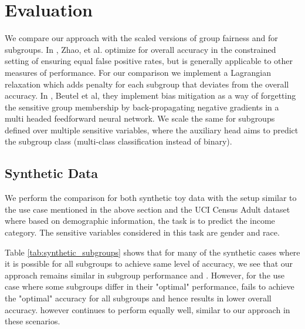 \section{Evaluation}

We compare our approach with the scaled versions of group fairness \cite{Zhao2017MenAL} and \cite{Beutel2017DataDA} for subgroups. In \cite{Zhao2017MenAL}, Zhao, et al. optimize for overall accuracy in the constrained setting of ensuring equal false positive rates, but is generally applicable to other measures of performance. For our comparison we implement a Lagrangian relaxation which adds penalty for each subgroup that deviates from the overall accuracy. In \cite{Beutel2017DataDA}, Beutel et al, they implement bias mitigation as a way of forgetting the sensitive group membership by back-propagating negative gradients in a multi headed feedforward neural network. We scale the same for subgroups defined over multiple sensitive variables, where the auxiliary head aims to predict the subgroup class (multi-class classification instead of binary).

\subsection{Synthetic Data}
We perform the comparison for both synthetic toy data with the setup similar to the use case mentioned in the above section and the UCI Census Adult dataset where based on demographic information, the task is to predict the income category. The sensitive variables considered in this task are gender and race.

Table \ref{tab:synthetic_subgroups} shows that for many of the synthetic cases where it is possible for all subgroups to achieve same level of accuracy, we see that our approach remains similar in subgroup performance \cite{Zhao2017MenAL} and \cite{Beutel2017DataDA}. However, for the use case where some subgroups differ in their "optimal" performance, \cite{Zhao2017MenAL} fails to achieve the "optimal" accuracy for all subgroups and hence results in lower overall accuracy. \cite{Beutel2017DataDA} however continues to perform equally well, similar to our approach in these scenarios.

